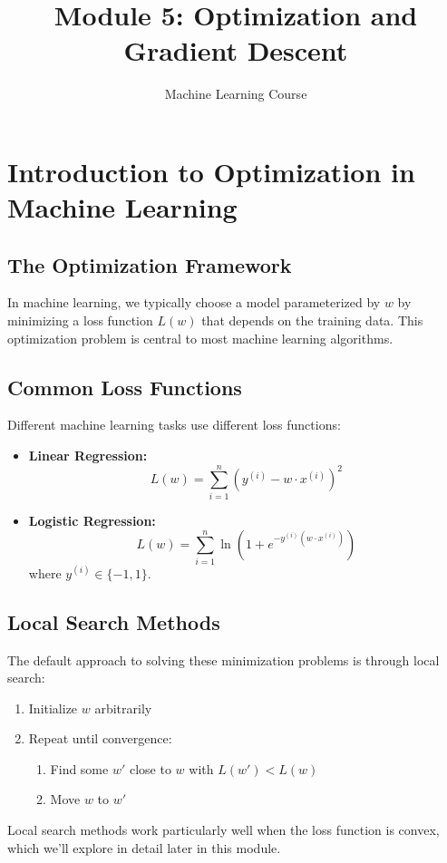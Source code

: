 \documentclass{article}
\title{Module 5: Optimization and Gradient Descent}
\author{Machine Learning Course}
\date{}
\begin{document}
\maketitle
\tableofcontents
\newpage

\section{Introduction to Optimization in Machine Learning}

\subsection{The Optimization Framework}
In machine learning, we typically choose a model parameterized by $w$ by minimizing a loss function $L(w)$ that depends on the training data. This optimization problem is central to most machine learning algorithms.

\subsection{Common Loss Functions}
Different machine learning tasks use different loss functions:
\begin{itemize}
    \item \textbf{Linear Regression:}
    \[
    L(w) = \sum_{i=1}^{n} \left(y^{(i)} - w \cdot x^{(i)}\right)^{2}
    \]
    \item \textbf{Logistic Regression:}
    \[
    L(w) = \sum_{i=1}^{n} \ln \left(1 + e^{-y^{(i)}(w \cdot x^{(i)})}\right)
    \]
    where $y^{(i)} \in \{-1, 1\}$.
\end{itemize}

\subsection{Local Search Methods}
The default approach to solving these minimization problems is through local search:
\begin{enumerate}
    \item Initialize $w$ arbitrarily
    \item Repeat until convergence:
    \begin{enumerate}
        \item Find some $w'$ close to $w$ with $L(w') < L(w)$
        \item Move $w$ to $w'$
    \end{enumerate}
\end{enumerate}
Local search methods work particularly well when the loss function is convex, which we'll explore in detail later in this module.
\end{document}
